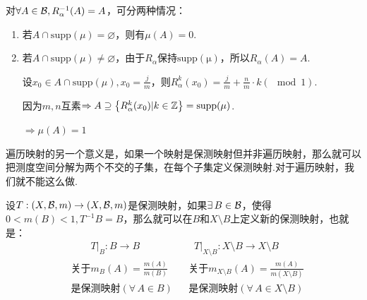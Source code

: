 \begin{instance}
    对$\forall A\in\mathcal{B},R_\alpha^{-1}(A)=A$，可分两种情况：
    \begin{enumerate}
        \item 若$A\cap\mathrm{supp}(\mu)=\varnothing$，则有$\mu(A)=0$.
        \item 若$A\cap\mathrm{supp}(\mu)\neq\varnothing$，由于$R_\alpha$保持$\mathrm{supp(\mu)}$，所以$R_\alpha(A)=A$.\par
        设$x_0\in A\cap\mathrm{supp}(\mu),x_0=\frac{j}{m}$，则$R_\alpha^k(x_0)=\frac{j}{m}+\frac{n}{m}\cdot k (\mod 1)$.\par
        因为$m,n$互素$\Rightarrow A\supseteq \left\{R_\alpha^k(x_0)|k\in\mathbb{Z}\right\} = \mathrm{supp}(\mu)$.\par
        $\Rightarrow \mu(A)=1$
    \end{enumerate}
\end{instance}

遍历映射的另一个意义是，如果一个映射是保测映射但并非遍历映射，那么就可以把测度空间分解为两个不交的子集，在每个子集定义保测映射.对于遍历映射，我们就不能这么做.\par
设$T:(X,\mathcal{B},m)\to(X,\mathcal{B},m)$是保测映射，如果$\exists\, B\in\mathcal{B}$，使得$0<m(B)<1,T^{-1}B=B$，那么就可以在$B$和$X\setminus B$上定义新的保测映射，也就是：
{\setjot[-3]\begin{align*}
    &\qquad T|_B:B\to B  & &\;\; T|_{X\setminus B}:X\setminus B\to X\setminus B \\
    &\text{关于}m_B(A)=\frac{m(A)}{m(B)} & &\text{关于}m_{X\setminus B}(A)=\frac{m(A)}{m(X\setminus B)} \\
    &\text{是保测映射}(\forall\, A\in B) & &\text{是保测映射}(\forall\, A\in X\setminus B)
\end{align*}}

